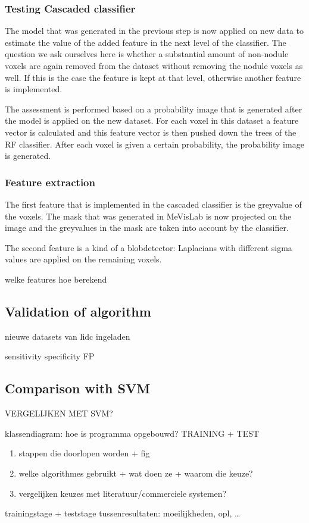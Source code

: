 
\subsubsection{Testing Cascaded classifier}
The model that was generated in the previous step is now applied on new data to
estimate the value of the added feature in the next level of the classifier.
The question we ask ourselves here is whether a substantial amount of
non-nodule voxels are again removed from the dataset without removing the nodule
voxels as well. If this is the case the feature is kept at that level, otherwise
another feature is implemented.

The assessment is performed based on a probability image that is generated after
the model is applied on the new dataset. For each voxel in this dataset a
feature vector is calculated and this feature vector is then pushed down the
trees of the RF classifier. After each voxel is given a certain probability, the
probability image is generated.


\subsubsection{Feature extraction} \label{sec:featureExtraction}
The first feature that is implemented in the cascaded classifier is the
greyvalue of the voxels. The mask that was generated in MeVisLab is now projected on the image
and the greyvalues in the mask are taken into account by the classifier.

The second feature is a kind of a blobdetector: Laplacians with different sigma
values are applied on the remaining voxels. %






welke features
hoe berekend

\subsection{Validation of algorithm}
nieuwe datasets van lidc ingeladen

sensitivity
specificity
FP


\subsection{Comparison with SVM}

VERGELIJKEN MET SVM?






klassendiagram: hoe is programma opgebouwd?
TRAINING + TEST
\begin{enumerate}
\item stappen die doorlopen worden + fig
\item welke algorithmes gebruikt + wat doen ze + waarom die keuze?
\item vergelijken keuzes met literatuur/commerciele systemen?
\end{enumerate}


trainingstage + teststage
tussenresultaten: moeilijkheden, opl, \ldots


